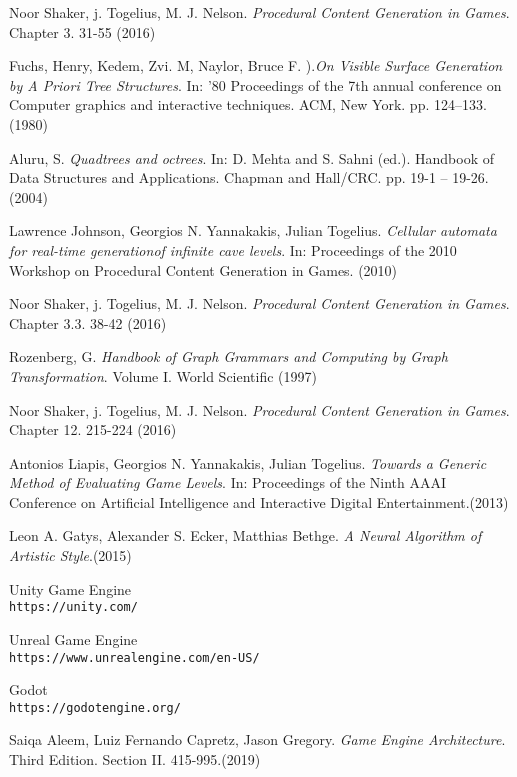 \begin{thebibliography}{9}
 Noor Shaker, j. Togelius, M. J. Nelson. \textit{Procedural Content Generation in Games}. Chapter 3. 31-55 (2016)

 Fuchs, Henry, Kedem, Zvi. M, Naylor, Bruce F. ).\textit{On Visible Surface Generation by A Priori Tree Structures}. In: '80 Proceedings of the 7th annual conference on Computer graphics and interactive techniques. ACM, New York. pp. 124–133. (1980)

 Aluru, S. \textit{Quadtrees and octrees}. In: D. Mehta and S. Sahni (ed.). Handbook of Data Structures and Applications. Chapman and Hall/CRC. pp. 19-1 -- 19-26. (2004)


 Lawrence Johnson, Georgios N. Yannakakis, Julian Togelius. \textit{Cellular automata for real-time generationof infinite cave levels}. In: Proceedings of the 2010 Workshop on Procedural Content Generation in Games. (2010)


 Noor Shaker, j. Togelius, M. J. Nelson. \textit{Procedural Content Generation in Games}. Chapter 3.3. 38-42 (2016)

 Rozenberg, G. \textit{Handbook of Graph Grammars and Computing by Graph Transformation}. Volume I. World Scientific (1997)


 Noor Shaker, j. Togelius, M. J. Nelson. \textit{Procedural Content Generation in Games}. Chapter 12. 215-224 (2016)

 Antonios Liapis, Georgios N. Yannakakis, Julian Togelius. \textit{Towards a Generic Method of Evaluating Game Levels}. In:  Proceedings of the Ninth AAAI Conference on Artificial Intelligence and Interactive Digital Entertainment.(2013)

 Leon A. Gatys, Alexander S. Ecker, Matthias Bethge. \textit{A Neural Algorithm of Artistic Style}.(2015)

 Unity Game Engine \\
\texttt{https://unity.com/}

 Unreal Game Engine \\
\texttt{https://www.unrealengine.com/en-US/}

 Godot \\
\texttt{https://godotengine.org/}

 Saiqa Aleem, Luiz Fernando Capretz, Jason Gregory. \textit{Game Engine Architecture}. Third Edition. Section II. 415-995.(2019)


\end{thebibliography}

